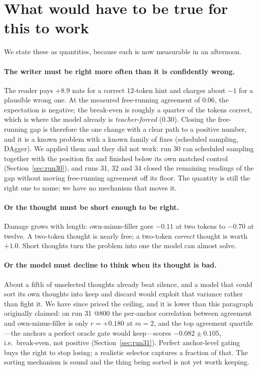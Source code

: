 \documentclass{article} %
\begin{document}
\section{What would have to be true for this to work}
\label{sec:whatwouldwork}

We state these as quantities, because each is now measurable in an afternoon.

\paragraph{The writer must be right more often than it is confidently wrong.} The reader pays $+8.9$ nats for a correct $12$-token hint and charges about $-1$ for a plausible wrong one. At the measured free-running agreement of $0.06$, the expectation is negative; the break-even is roughly a quarter of the tokens correct, which is where the model already is \emph{teacher-forced} ($0.30$). Closing the free-running gap is therefore the one change with a clear path to a positive number, and it is a known problem with a known family of fixes (scheduled sampling, DAgger). We applied them and they did not work: run 30 ran scheduled sampling together with the position fix and finished below its own matched control (Section~\ref{sec:run30}), and runs 31, 32 and 34 closed the remaining readings of the gap without moving free-running agreement off its floor. The quantity is still the right one to name; we have no mechanism that moves it.

\paragraph{Or the thought must be short enough to be right.} Damage grows with length: own-minus-filler goes $-0.11$ at two tokens to $-0.70$ at twelve. A two-token thought is nearly free; a two-token \emph{correct} thought is worth $+1.0$. Short thoughts turn the problem into one the model can almost solve.

\paragraph{Or the model must decline to think when its thought is bad.} About a fifth of unselected thoughts already beat silence, and a model that could sort its own thoughts into keep and discard would exploit that variance rather than fight it. We have since priced the ceiling, and it is lower than this paragraph originally claimed: on run 31 @800 the per-anchor correlation between agreement and own-minus-filler is only $r = +0.180$ at $m=2$, and the top agreement quartile---the anchors a perfect oracle gate would keep---scores $-0.082 \pm 0.105$, i.e.\ break-even, not positive (Section~\ref{sec:run31}). Perfect anchor-level gating buys the right to stop losing; a realistic selector captures a fraction of that. The sorting mechanism is sound and the thing being sorted is not yet worth keeping.
\end{document}
